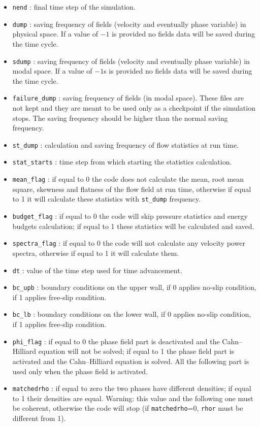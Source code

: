 \begin{itemize}
\item \texttt{nend} : final time step of the simulation.
\item \texttt{dump} : saving frequency of fields (velocity and eventually phase variable) in physical space. If a value of $-1$ is provided no fields data will be saved during the time cycle.
\item \texttt{sdump} : saving frequency of fields (velocity and eventually phase variable) in modal space. If a value of $-1$s is provided no fields data will be saved during the time cycle.
\item \texttt{failure\_dump} : saving frequency of fields (in modal space). These files are not kept and they are meant to be used only as a checkpoint if the simulation stops. The saving frequency should be higher than the normal saving frequency.
\item \texttt{st\_dump} : calculation and saving frequency of flow statistics at run time.
\item \texttt{stat\_starts} : time step from which starting the statistics calculation.
\item \texttt{mean\_flag} : if equal to 0 the code does not calculate the mean, root mean square, skewness and flatness of the flow field at run time, otherwise if equal to 1 it will calculate these statistics with \texttt{st\_dump} frequency.
\item \texttt{budget\_flag} : if equal to 0 the code will skip pressure statistics and energy budgets calculation; if equal to 1 these statistics will be calculated and saved.
\item \texttt{spectra\_flag} : if equal to 0 the code will not calculate any velocity power spectra, otherwise if equal to 1 it will calculate them.
\item \texttt{dt} : value of the time step used for time advancement.
\item \texttt{bc\_upb} : boundary conditions on the upper wall, if 0 applies no-slip condition, if 1 applies free-slip condition.
\item \texttt{bc\_lb} : boundary conditions on the lower wall, if 0 applies no-slip condition, if 1 applies free-slip condition.
\item \texttt{phi\_flag} : if equal to 0 the phase field part is deactivated and the Cahn--Hilliard equation will not be solved; if equal to 1 the phase field part is activated and the Cahn--Hilliard equation is solved. All the following part is used only when the phase field is activated.
\item \texttt{matchedrho} : if equal to zero the two phases have different densities; if equal to 1 their densities are equal. Warning: this value and the following one must be coherent, otherwise the code will stop (if \texttt{matchedrho}=0, \texttt{rhor} must be different from 1).

\end{itemize}
